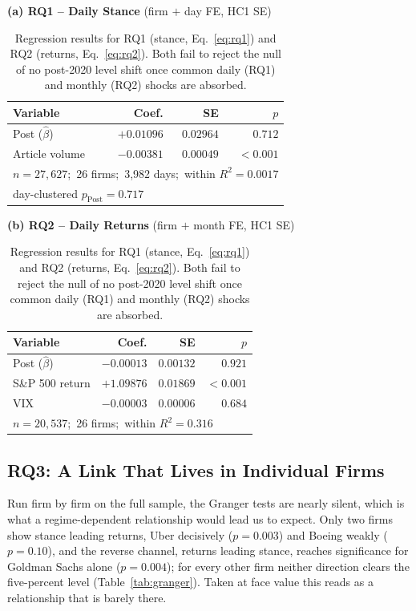\documentclass[conference]{IEEEtran}
\begin{document}
\begin{table}[t]
\caption{Regression results for RQ1 (stance, Eq.~\ref{eq:rq1}) and RQ2 (returns, Eq.~\ref{eq:rq2}). Both fail to reject the null of no post-2020 level shift once common daily (RQ1) and monthly (RQ2) shocks are absorbed.}
\label{tab:results}
\centering
\small
\textbf{(a) RQ1 -- Daily Stance} (firm $+$ day FE, HC1 SE)\\[3pt]
\begin{tabular}{lrrr}
\toprule
Variable & Coef. & SE & $p$ \\
\midrule
Post ($\hat{\beta}$) & $+0.01096$ & $0.02964$ & $0.712$ \\
Article volume       & $-0.00381$ & $0.00049$ & $<0.001$ \\
\midrule
\multicolumn{4}{l}{$n=27{,}627$;\ 26 firms;\ 3,982 days;\ within $R^2=0.0017$} \\
\multicolumn{4}{l}{day-clustered $p_{\text{Post}}=0.717$} \\
\bottomrule
\end{tabular}

\vspace{7pt}
\textbf{(b) RQ2 -- Daily Returns} (firm $+$ month FE, HC1 SE)\\[3pt]
\begin{tabular}{lrrr}
\toprule
Variable & Coef. & SE & $p$ \\
\midrule
Post ($\hat{\beta}$) & $-0.00013$ & $0.00132$ & $0.921$ \\
S\&P 500 return      & $+1.09876$ & $0.01869$ & $<0.001$ \\
VIX                  & $-0.00003$ & $0.00006$ & $0.684$ \\
\midrule
\multicolumn{4}{l}{$n=20{,}537$;\ 26 firms;\ within $R^2=0.316$} \\
\bottomrule
\end{tabular}
\end{table}

\subsection{RQ3: A Link That Lives in Individual Firms}
Run firm by firm on the full sample, the Granger tests are nearly silent, which is
what a regime-dependent relationship would lead us to expect. Only two firms show
stance leading returns, Uber decisively ($p = 0.003$) and Boeing weakly
($p = 0.10$), and the reverse channel, returns leading stance, reaches significance
for Goldman Sachs alone ($p = 0.004$); for every other firm neither direction clears
the five-percent level (Table~\ref{tab:granger}). Taken at face value this reads as a
relationship that is barely there.
\end{document}

